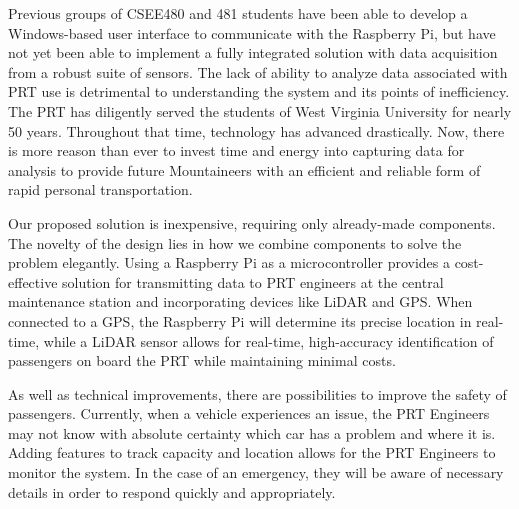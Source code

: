 Previous groups of CSEE480 and 481 students have been able to develop a Windows-based user interface to communicate with the Raspberry Pi, but have not yet been able to implement a fully integrated solution with data acquisition from a robust suite of sensors. The lack of ability to analyze data associated with PRT use is detrimental to understanding the system and its points of inefficiency. The PRT has diligently served the students of West Virginia University for nearly 50 years. Throughout that time, technology has advanced drastically. Now, there is more reason than ever to invest time and energy into capturing data for analysis to provide future Mountaineers with an efficient and reliable form of rapid personal transportation.

Our proposed solution is inexpensive, requiring only already-made components. The novelty of the design lies in how we combine components to solve the problem elegantly. Using a Raspberry Pi as a microcontroller provides a cost-effective solution for transmitting data to PRT engineers at the central maintenance station and incorporating devices like LiDAR and GPS. When connected to a GPS, the Raspberry Pi will determine its precise location in real-time, while a LiDAR sensor allows for real-time, high-accuracy identification of passengers on board the PRT while maintaining minimal costs.

As well as technical improvements, there are possibilities to improve the safety of passengers. Currently, when a vehicle experiences an issue, the PRT Engineers may not know with absolute certainty which car has a problem and where it is. Adding features to track capacity and location allows for the PRT Engineers to monitor the system. In the case of an emergency, they will be aware of necessary details in order to respond quickly and appropriately.
